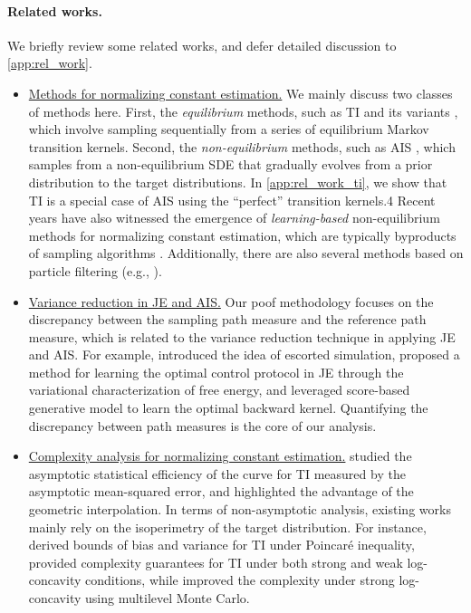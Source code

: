\paragraph{Related works.} We briefly review some related works, and defer detailed discussion to \cref{app:rel_work}.
\begin{itemize}[wide=0pt,itemsep=0pt, topsep=0pt,parsep=0pt,partopsep=0pt]
    \item \underline{Methods for normalizing constant estimation.} We mainly discuss two classes of methods here. First, the \emph{equilibrium} methods, such as TI \citep{kirkwood1935statistical} and its variants \citep{brosse2018normalizing,ge2020estimating,chehab2023provable,kook2024sampling}, which involve sampling sequentially from a series of equilibrium Markov transition kernels. Second, the \emph{non-equilibrium} methods, such as AIS \citep{neal2001annealed}, which samples from a non-equilibrium SDE that gradually evolves from a prior distribution to the target distributions. In \cref{app:rel_work_ti}, we show that TI is a special case of AIS using the ``perfect'' transition kernels.4 Recent years have also witnessed the emergence of \textit{learning-based} non-equilibrium methods for normalizing constant estimation, which are typically byproducts of sampling algorithms \citep{zhang2022path,nusken2021solving,richter2024improved,sun2024dynamical,vargas2024transport,albergo2024nets,blessing2025underdamped,chen2025sequential}. Additionally, there are also several methods based on particle filtering (e.g., \citet{kostov2017algorithm,jasra2018multilevel,ruzayqat2022multilevel}).
    \item \underline{Variance reduction in JE and AIS.} Our poof methodology focuses on the discrepancy between the sampling path measure and the reference path measure, which is related to the variance reduction technique in applying JE and AIS. For example, \cite{vaikuntanathan2008escorted} introduced the idea of escorted simulation, \cite{hartmann2017variational} proposed a method for learning the optimal control protocol in JE through the variational characterization of free energy, and \cite{doucet2022score} leveraged score-based generative model to learn the optimal backward kernel. Quantifying the discrepancy between path measures is the core of our analysis.
    \item \underline{Complexity analysis for normalizing constant estimation.} \cite{chehab2023provable} studied the asymptotic statistical efficiency of the curve for TI measured by the asymptotic mean-squared error, and highlighted the advantage of the geometric interpolation. In terms of non-asymptotic analysis, existing works mainly rely on the isoperimetry of the target distribution. For instance, \cite{andrieu2016sampling}  derived bounds of bias and variance for TI under Poincar\'e inequality, \cite{brosse2018normalizing} provided complexity guarantees for TI under both strong and weak log-concavity conditions, while \cite{ge2020estimating} improved the complexity under strong log-concavity using multilevel Monte Carlo.
\end{itemize}